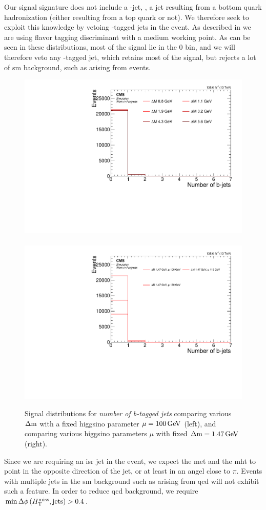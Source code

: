 Our signal signature does not include a \PQb-jet, \ie, a jet resulting from a bottom quark hadronization (either resulting from a top quark or not). We therefore seek to exploit this knowledge by vetoing \PQb-tagged jets in the event. As described in  we are using \DEEPCSV flavor tagging discriminant with a medium working point. As can be seen in these distributions, most of the signal lie in the 0 bin, and we will therefore veto any \PQb-tagged jet, which retains most of the signal, but rejects a lot of \gls{sm} background, such as arising from \ttbar events. 

\begin{figure}[h]
\centering
\includegraphics[width=0.48\linewidth]{plots/signal_common_distributions_fixed_mu/none_BTagsDeepMedium.pdf} \,
\includegraphics[width=0.48\linewidth]{plots/signal_common_distributions_fixed_dm/none_BTagsDeepMedium.pdf}  \\
\caption[Signal \emph{number of b-tagged jets} distributions]{ Signal distributions for \emph{number of b-tagged jets} comparing various $\Delta\mathrm{m}$ with a fixed higgsino parameter $\mu=100\,\text{Ge\hspace{-.08em}V}$ (left), and comparing various higgsino parameters $\mu$ with fixed $\Delta\mathrm{m}=1.47\,\text{Ge\hspace{-.08em}V}$ (right).}
\label{fig:signal-bjets}
\end{figure}

Since we are requiring an \gls{isr} jet in the event, we expect the \gls{met} and the \gls{mht} to point in the opposite direction of the jet, or at least in an angel close to $\pi$. Events with multiple jets in the \gls{sm} background such as arising from \gls{qcd} will not exhibit such a feature. In order to reduce \gls{qcd} background, we require $\min{\Delta\phi\left(\ensuremath{H_{\mathrm{T}}^{\text{miss}}},\mathrm{jets}\right)} > 0.4$.

